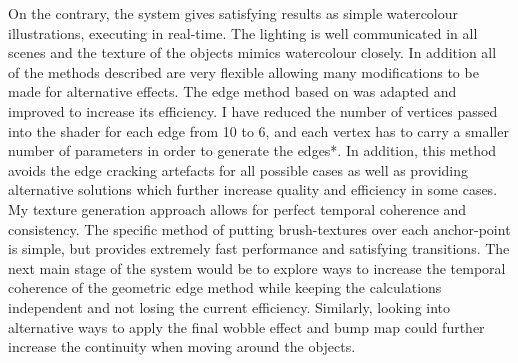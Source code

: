 \documentclass[a4paper, 12pt]{article}
\begin{document}
On the contrary, the system gives satisfying results as simple watercolour illustrations, executing in real-time. The lighting is well communicated in all scenes and the texture of the objects mimics watercolour closely. In addition all of the methods described are very flexible allowing many modifications to be made for alternative effects. The edge method based on \cite{Hughes2004} was adapted and improved to increase its efficiency. I have reduced the number of vertices passed into the shader for each edge from 10 to 6, and each vertex has to carry a smaller number of parameters in order to generate the edges*. In addition, this method avoids the edge cracking artefacts for all possible cases as well as providing alternative solutions which further increase quality and efficiency in some cases. My texture generation approach allows for perfect temporal coherence and consistency. The specific method of putting brush-textures over each anchor-point is simple, but provides extremely fast performance and satisfying transitions. The next main stage of the system would be to explore ways to increase the temporal coherence of the geometric edge method while keeping the calculations independent and not losing the current efficiency. Similarly, looking into alternative ways to apply the final wobble effect and bump map could further increase the continuity when moving around the objects.

\printbibliography
\end{document}
